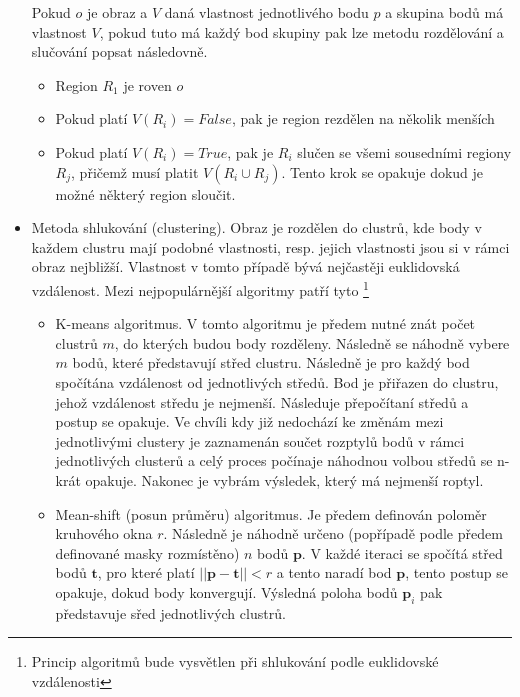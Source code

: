\documentclass[twoside]{ctuthesis}
\newcommand{\tl}[1]{$\mathbf{#1}$}
\begin{document}
\begin{itemize}
    Pokud $o$ je obraz a $V$ daná vlastnost jednotlivého bodu $p$ a skupina bodů má vlastnost $V$, pokud tuto má každý bod skupiny pak lze metodu rozdělování a slučování popsat následovně.\cite{segmentace_metody}
    \begin{itemize}
        \item Region $R_1$ je roven $o$
        \item Pokud platí $V(R_i) = False$, pak je region rezdělen na několik menších
        \item Pokud platí $V(R_i) = True$, pak je $R_i$ slučen se všemi sousedními regiony $R_j$, přičemž musí platit $V(R_i \cup R_j)$. Tento krok se opakuje dokud je možné některý region sloučit.
    \end{itemize}         %
\item Metoda shlukování (clustering). Obraz je rozdělen do clustrů, kde body v každem clustru mají podobné vlastnosti, resp. jejich vlastnosti jsou si v rámci obraz nejbližší. Vlastnost v tomto případě bývá nejčastěji euklidovská vzdálenost. Mezi nejpopulárnější algoritmy patří tyto \footnote{Princip algoritmů bude vysvětlen při shlukování podle euklidovské vzdálenosti}
    \begin{itemize}
        \item K-means algoritmus. V tomto algoritmu je předem nutné znát počet clustrů $m$, do kterých budou body rozděleny. Následně se náhodně vybere $m$ bodů, které představují střed clustru. Následně je pro každý bod spočítána vzdálenost od jednotlivých středů. Bod je přiřazen do clustru, jehož vzdálenost středu je nejmenší. Následuje přepočítaní středů a postup se opakuje. Ve chvíli kdy již nedochází ke změnám mezi jednotlivými clustery je zaznamenán součet rozptylů bodů v rámci jednotlivých clusterů a celý proces počínaje náhodnou volbou středů se n-krát opakuje. Nakonec je vybrám výsledek, který má nejmenší roptyl.
        \item Mean-shift (posun průměru) algoritmus. Je předem definován poloměr kruhového okna $r$. Následně je náhodně určeno (popřípadě podle předem definované masky rozmístěno) $n$ bodů \tl{p}. V každé iteraci se spočítá střed bodů $\mathbf{t}$, pro které platí $||\mathbf{p} - \mathbf{t}|| < r$ a tento naradí bod \tl{p}, tento postup se opakuje, dokud body konvergují. Výsledná poloha bodů $\mathbf{p}_i$ pak představuje sřed jednotlivých clustrů. 

\end{itemize}
\end{itemize}
\end{document}
